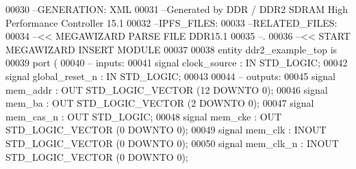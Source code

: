 \begin{DoxyCode}
{00030 \textcolor{keyword}{--GENERATION: XML}
00031 \textcolor{keyword}{--Generated by DDR / DDR2 SDRAM High Performance Controller 15.1}
00032 \textcolor{keyword}{--IPFS\_FILES:}
00033 \textcolor{keyword}{--RELATED\_FILES:}
00034 \textcolor{keyword}{--<< MEGAWIZARD PARSE FILE DDR15.1}
00035 \textcolor{keyword}{--.}
00036 \textcolor{keyword}{--<< START MEGAWIZARD INSERT MODULE}
00037 
00038 \textcolor{keywordflow}{entity }ddr2_example_top \textcolor{keywordflow}{is} 
00039         \textcolor{keywordflow}{port} \textcolor{vhdlchar}{(}
00040 \textcolor{keyword}{              -- inputs:}
00041                  \textcolor{keywordflow}{signal} \textcolor{vhdlchar}{clock_source} \textcolor{vhdlchar}{:} \textcolor{keywordflow}{IN} \textcolor{comment}{STD\_LOGIC};
00042                  \textcolor{keywordflow}{signal} \textcolor{vhdlchar}{global_reset_n} \textcolor{vhdlchar}{:} \textcolor{keywordflow}{IN} \textcolor{comment}{STD\_LOGIC};
00043 
00044 \textcolor{keyword}{              -- outputs:}
00045                  \textcolor{keywordflow}{signal} \textcolor{vhdlchar}{mem_addr} \textcolor{vhdlchar}{:} \textcolor{keywordflow}{OUT} \textcolor{comment}{STD\_LOGIC\_VECTOR} \textcolor{vhdlchar}{(}\textcolor{vhdllogic}{}\textcolor{vhdllogic}{12} \textcolor{keywordflow}{DOWNTO} \textcolor{vhdllogic}{}\textcolor{vhdllogic}{0}\textcolor{vhdlchar}{)};
00046                  \textcolor{keywordflow}{signal} \textcolor{vhdlchar}{mem_ba} \textcolor{vhdlchar}{:} \textcolor{keywordflow}{OUT} \textcolor{comment}{STD\_LOGIC\_VECTOR} \textcolor{vhdlchar}{(}\textcolor{vhdllogic}{}\textcolor{vhdllogic}{2} \textcolor{keywordflow}{DOWNTO} \textcolor{vhdllogic}{}\textcolor{vhdllogic}{0}\textcolor{vhdlchar}{)};
00047                  \textcolor{keywordflow}{signal} \textcolor{vhdlchar}{mem_cas_n} \textcolor{vhdlchar}{:} \textcolor{keywordflow}{OUT} \textcolor{comment}{STD\_LOGIC};
00048                  \textcolor{keywordflow}{signal} \textcolor{vhdlchar}{mem_cke} \textcolor{vhdlchar}{:} \textcolor{keywordflow}{OUT} \textcolor{comment}{STD\_LOGIC\_VECTOR} \textcolor{vhdlchar}{(}\textcolor{vhdllogic}{}\textcolor{vhdllogic}{0} \textcolor{keywordflow}{DOWNTO} \textcolor{vhdllogic}{}\textcolor{vhdllogic}{0}\textcolor{vhdlchar}{)};
00049                  \textcolor{keywordflow}{signal} \textcolor{vhdlchar}{mem_clk} \textcolor{vhdlchar}{:} \textcolor{keywordflow}{INOUT} \textcolor{comment}{STD\_LOGIC\_VECTOR} \textcolor{vhdlchar}{(}\textcolor{vhdllogic}{}\textcolor{vhdllogic}{0} \textcolor{keywordflow}{DOWNTO} \textcolor{vhdllogic}{}\textcolor{vhdllogic}{0}\textcolor{vhdlchar}{)};
00050                  \textcolor{keywordflow}{signal} \textcolor{vhdlchar}{mem_clk_n} \textcolor{vhdlchar}{:} \textcolor{keywordflow}{INOUT} \textcolor{comment}{STD\_LOGIC\_VECTOR} \textcolor{vhdlchar}{(}\textcolor{vhdllogic}{}\textcolor{vhdllogic}{0} \textcolor{keywordflow}{DOWNTO} \textcolor{vhdllogic}{}\textcolor{vhdllogic}{0}\textcolor{vhdlchar}{)};
}
\end{DoxyCode}
